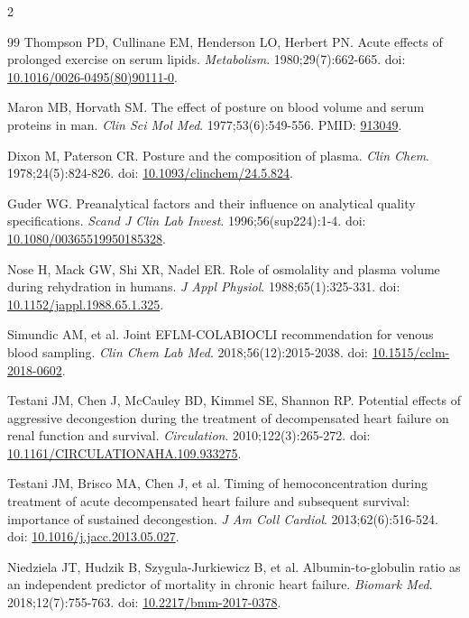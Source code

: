 \documentclass[10pt,letterpaper]{article}
\begin{document}
\begin{multicols}{2}
\begin{thebibliography}{99}
 Thompson PD, Cullinane EM, Henderson LO, Herbert PN. Acute effects of prolonged exercise on serum lipids. \textit{Metabolism}. 1980;29(7):662-665. doi: \href{https://doi.org/10.1016/0026-0495(80)90111-0}{10.1016/0026-0495(80)90111-0}.

 Maron MB, Horvath SM. The effect of posture on blood volume and serum proteins in man. \textit{Clin Sci Mol Med}. 1977;53(6):549-556. PMID: \href{https://pubmed.ncbi.nlm.nih.gov/913049/}{913049}.

 Dixon M, Paterson CR. Posture and the composition of plasma. \textit{Clin Chem}. 1978;24(5):824-826. doi: \href{https://doi.org/10.1093/clinchem/24.5.824}{10.1093/clinchem/24.5.824}.

 Guder WG. Preanalytical factors and their influence on analytical quality specifications. \textit{Scand J Clin Lab Invest}. 1996;56(sup224):1-4. doi: \href{https://doi.org/10.1080/00365519950185328}{10.1080/00365519950185328}.

 Nose H, Mack GW, Shi XR, Nadel ER. Role of osmolality and plasma volume during rehydration in humans. \textit{J Appl Physiol}. 1988;65(1):325-331. doi: \href{https://doi.org/10.1152/jappl.1988.65.1.325}{10.1152/jappl.1988.65.1.325}.

 Simundic AM, et al. Joint EFLM-COLABIOCLI recommendation for venous blood sampling. \textit{Clin Chem Lab Med}. 2018;56(12):2015-2038. doi: \href{https://doi.org/10.1515/cclm-2018-0602}{10.1515/cclm-2018-0602}.

 Testani JM, Chen J, McCauley BD, Kimmel SE, Shannon RP. Potential effects of aggressive decongestion during the treatment of decompensated heart failure on renal function and survival. \textit{Circulation}. 2010;122(3):265-272. doi: \href{https://doi.org/10.1161/CIRCULATIONAHA.109.933275}{10.1161/CIRCULATIONAHA.109.933275}.

 Testani JM, Brisco MA, Chen J, et al. Timing of hemoconcentration during treatment of acute decompensated heart failure and subsequent survival: importance of sustained decongestion. \textit{J Am Coll Cardiol}. 2013;62(6):516-524. doi: \href{https://doi.org/10.1016/j.jacc.2013.05.027}{10.1016/j.jacc.2013.05.027}.

 Niedziela JT, Hudzik B, Szygula-Jurkiewicz B, et al. Albumin-to-globulin ratio as an independent predictor of mortality in chronic heart failure. \textit{Biomark Med}. 2018;12(7):755-763. doi: \href{https://doi.org/10.2217/bmm-2017-0378}{10.2217/bmm-2017-0378}.


\end{thebibliography}
\end{multicols}
\end{document}
